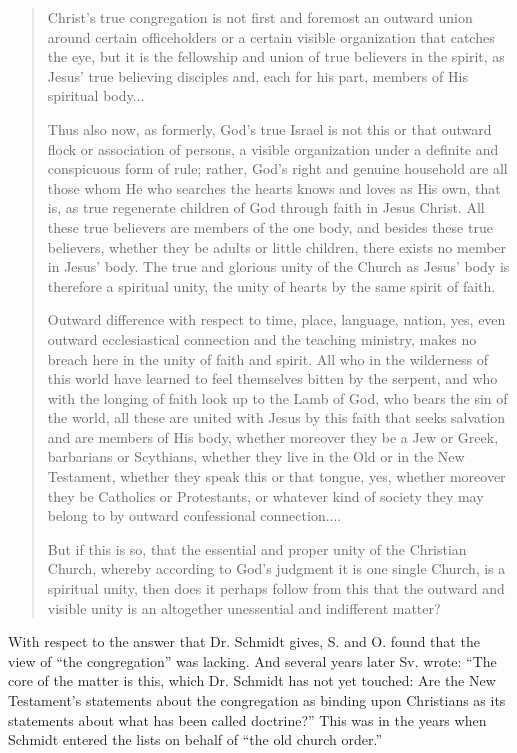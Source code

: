 \begin{quote}
Christ’s true congregation is not first and foremost an outward union around certain officeholders or a certain visible organization that catches the eye, but it is the fellowship and union of true believers in the spirit, as Jesus’ true believing disciples and, each for his part, members of His spiritual body...

Thus also now, as formerly, God’s true Israel is not this or that outward flock or association of persons, a visible organization under a definite and conspicuous form of rule; rather, God’s right and genuine household are all those whom He who searches the hearts knows and loves as His own, that is, as true regenerate children of God through faith in Jesus Christ. All these true believers are members of the one body, and besides these true believers, whether they be adults or little children, there exists no member in Jesus’ body. The true and glorious unity of the Church as Jesus’ body is therefore a spiritual unity, the unity of hearts by the same spirit of faith.

Outward difference with respect to time, place, language, nation, yes, even outward ecclesiastical connection and the teaching ministry, makes no breach here in the unity of faith and spirit. All who in the wilderness of this world have learned to feel themselves bitten by the serpent, and who with the longing of faith look up to the Lamb of God, who bears the sin of the world, all these are united with Jesus by this faith that seeks salvation and are members of His body, whether moreover they be a Jew or Greek, barbarians or Scythians, whether they live in the Old or in the New Testament, whether they speak this or that tongue, yes, whether moreover they be Catholics or Protestants, or whatever kind of society they may belong to by outward confessional connection....

But if this is so, that the essential and proper unity of the Christian Church, whereby according to God’s judgment it is one single Church, is a spiritual unity, then does it perhaps follow from this that the outward and visible unity is an altogether unessential and indifferent matter?

\end{quote}

With respect to the answer that Dr. Schmidt gives, S. and O. found that the view of “the congregation” was lacking. And several years later Sv. wrote: “The core of the matter is this, which Dr. Schmidt has not yet touched: Are the New Testament’s statements about the congregation as binding upon Christians as its statements about what has been called doctrine?” This was in the years when Schmidt entered the lists on behalf of “the old church order.”

